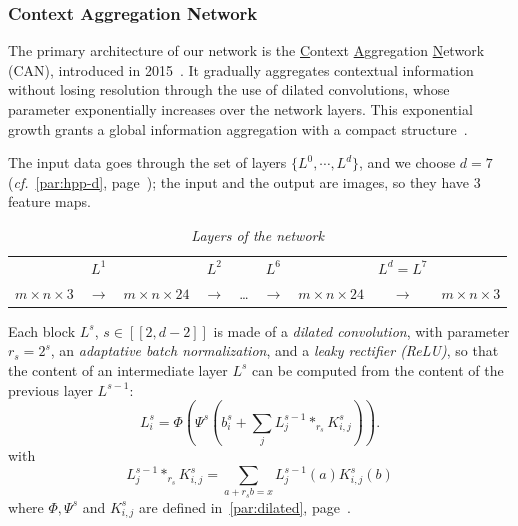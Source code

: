 \documentclass{article}
\begin{document}
        \subsubsection{Context Aggregation Network}
            The primary architecture of our network is the \underline{C}ontext \underline{A}ggregation \underline{N}etwork (CAN), introduced in 2015~\cite{yu2015}. It gradually aggregates contextual information without losing resolution through the use of dilated convolutions, whose parameter exponentially increases over the network layers. This exponential growth grants a global information aggregation with a compact structure~\cite{yu2015,chen2017}.
            \par
            The input data goes through the set of layers $\{L^0, \cdots, L^d\}$, and we choose $d=7$ (\textit{cf.}~\ref{par:hpp-d}, page~\pageref{par:hpp-d}); the input and the output are images, so they have 3 feature maps.

            \begin{table}[!ht]
                \centering
                \begin{tabular}{ccccccccc}
                    \hline
                     & $L^1$ & & $L^2$ & & $L^6$ & & $L^d=L^7$ & \\
                    $m\times n\times 3$ & $\longrightarrow$ &$m\times n\times 24$ & $\longrightarrow$ & \dots & $\longrightarrow$ & $m\times n\times 24$ & $\longrightarrow$ & $m\times n\times 3$ \\
                    \hline
                \end{tabular}
                \caption{\textit{Layers of the network}}
            \end{table}
            \par
            Each block $L^s$, $s\in [\![2,d-2]\!]$ is made of a \textit{dilated convolution}, with parameter $r_s=2^s$, an \textit{adaptative batch normalization}, and a \textit{leaky rectifier (ReLU)}, so that the content of an intermediate layer $L^s$ can be computed from the content of the previous layer $L^{s-1}$:
            \begin{equation}
                L_i^s=\Phi\left(\Psi^s\left(b_i^s+\sum_jL_j^{s-1}*_{r_s}K^s_{i,j}\right)\right).
            \end{equation}
            with
            \begin{equation}
                L_j^{s-1}*_{r_s}K^s_{i,j}=\sum_{a+r_sb=x}L_j^{s-1}(a)K_{i,j}^s(b)
            \end{equation}
            where $\Phi, \Psi^s$ and $K^s_{i,j}$ are defined in~\ref{par:dilated}, page~\pageref{par:dilated}.
\end{document}
